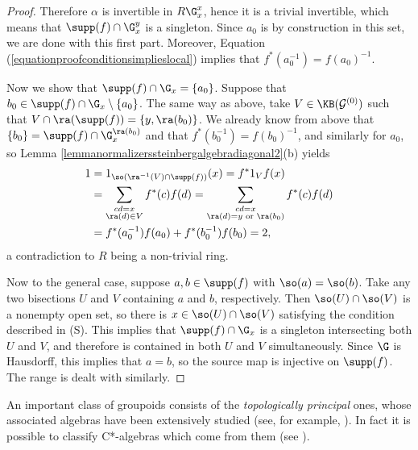 \begin{proof}
Therefore $\alpha$ is invertible in $R\G_x^x$, hence it is a trivial invertible, which means that $\supp(f)\cap \G_x^y$ is a singleton. Since $a_0$ is by construction in this set, we are done with this first part. Moreover, Equation (\ref{equationproofconditionsimplieslocal}) implies that $f^*(a_0^{-1})=f(a_0)^{-1}$.


Now we show that $\supp(f)\cap\G_x=\left\{a_0\right\}$. Suppose that $b_0\in\supp(f)\cap \G_x\setminus\left\{a_0\right\}$. The same way as above, take $V\in\KB(\mathcal{G}^{(0)})$ such that $V\cap \ra(\supp(f))=\left\{y,\ra(b_0)\right\}$. We already know from above that $\left\{b_0\right\}=\supp(f)\cap\G_x^{\ra(b_0)}$ and that $f^*(b_0^{-1})=f(b_0)^{-1}$, and similarly for $a_0$, so Lemma \ref{lemmanormalizerssteinbergalgebradiagonal2}(b) yields
\begin{align*}
1&=1_{\so(\ra^{-1}(V)\cap\supp(f))}(x)=f^*1_Vf(x)\\
&=\sum_{\substack{cd=x\\\ra(d)\in V}}f^*(c)f(d)=\sum_{\substack{cd=x\\\ra(d)=y\text{ or }\ra(b_0)}}f^*(c)f(d)\\
&=f^*(a_0^{-1})f(a_0)+f^*(b_0^{-1})f(b_0)=2,
\end{align*}
a contradiction to $R$ being a non-trivial ring.

Now to the general case, suppose $a,b\in\supp(f)$ with $\so(a)=\so(b)$. Take any two bisections $U$ and $V$ containing $a$ and $b$, respectively. Then $\so(U)\cap \so(V)$ is a nonempty open set, so there is $x\in \so(U)\cap \so(V)$ satisfying the condition described in (S). This implies that $\supp(f)\cap\G_x$ is a singleton intersecting both $U$ and $V$, and therefore is contained in both $U$ and $V$ simultaneously. Since $\G$ is Hausdorff, this implies that $a=b$, so the source map is injective on $\supp(f)$. The range is dealt with similarly.\qedhere
\end{proof}

An important class of groupoids consists of the \emph{topologically principal} ones, whose associated algebras have been extensively studied (see, for example, \cite{MR3189105,MR2745642,MR1681679,MR2590626}). In fact it is possible to classify C*-algebras which come from them (see \cite{MR2460017}).

